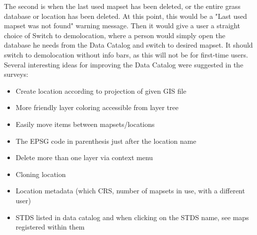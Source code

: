 \documentclass[a4paper,10pt,twoside]{article}
\begin{document}
\noindent The second is when the last used mapset has been deleted, or the entire grass database or location has been deleted. At this point, this would be a "Last used mapset was not found" warning message.
Then it would give a user a straight choice of Switch to demolocation, where a person would simply open the database he needs from the Data Catalog and switch to desired mapset. 
It should switch to demolocation without info bars, as this will not be for first-time users.\\

\noindent Several interesting ideas for improving the Data Catalog were suggested in the surveys:
\begin{itemize}
\item Create location according to projection of given GIS file
\end{itemize}

\begin{itemize}
\item More friendly layer coloring accessible from layer tree
\end{itemize}

\begin{itemize}
\item Easily move items between mapsets/locations
\end{itemize}

\begin{itemize}
\item The EPSG code in parenthesis just after the location name
\end{itemize}

\begin{itemize}
\item Delete more than one layer via context menu
\end{itemize}

\begin{itemize}
\item Cloning location
\end{itemize}

\begin{itemize}
\item Location metadata (which CRS, number of mapsets in use, with a different user)
\end{itemize}

\begin{itemize}
\item STDS listed in data catalog and when clicking on the STDS name, see maps registered within them
\end{itemize}
\end{document}
